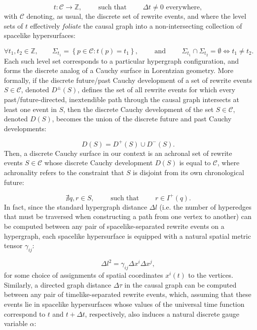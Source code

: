 \documentclass{article}
\begin{document}
\begin{equation}
t : \mathcal{C} \to \mathbb{Z}, \qquad \text{ such that } \qquad \Delta t \neq 0 \text{ everywhere},
\end{equation}
with ${\mathcal{C}}$ denoting, as usual, the discrete set of rewrite events, and where the level sets of $t$ effectively \textit{foliate} the causal graph into a non-intersecting collection of spacelike hypersurfaces:

\begin{equation}
\forall t_1, t_2 \in \mathbb{Z}, \qquad \Sigma_{t_1} = \left\lbrace p \in \mathcal{C} : t \left( p \right) = t_1 \right\rbrace, \qquad \text{ and } \qquad \Sigma_{t_1} \cap \Sigma_{t_2} = \emptyset \Leftrightarrow t_1 \neq t_2.
\end{equation}
Each such level set corresponds to a particular hypergraph configuration, and forms the discrete analog of a Cauchy surface in Lorentzian geometry. More formally, if the discrete future/past Cauchy development of a set of rewrite events ${S \in \mathcal{C}}$, denoted ${D^{\pm} \left( S \right)}$, defines the set of all rewrite events for which every past/future-directed, inextendible path through the causal graph intersects at least one event in $S$, then the discrete Cauchy development of the set ${S \in \mathcal{C}}$, denoted ${D \left( S \right)}$, becomes the union of the discrete future and past Cauchy developments:

\begin{equation}
D \left( S \right) = D^{+} \left( S \right) \cup D^{-} \left( S \right).
\end{equation}
Then, a discrete Cauchy surface in our context is an achronal set of rewrite events ${S \in \mathcal{C}}$ whose discrete Cauchy development ${D \left( S \right)}$ is equal to ${\mathcal{C}}$, where achronality refers to the constraint that $S$ is disjoint from its own chronological future:

\begin{equation}
\nexists q, r \in S, \qquad \text{ such that } \qquad r \in I^{+} \left( q \right).
\end{equation}
In fact, since the standard hypergraph distance ${\Delta l}$ (i.e. the number of hyperedges that must be traversed when constructing a path from one vertex to another) can be computed between any pair of spacelike-separated rewrite events on a hypergraph, each spacelike hypersurface is equipped with a natural spatial metric tensor ${\gamma_{i j}}$:

\begin{equation}
\Delta l^2 = \gamma_{i j} \Delta x^i \Delta x^j,
\end{equation}
for some choice of assignments of spatial coordinates ${x^i \left( t \right)}$ to the vertices. Similarly, a directed graph distance ${\Delta \tau}$ in the causal graph can be computed between any pair of timelike-separated rewrite events, which, assuming that these events lie in spacelike hypersurfaces whose values of the universal time function correspond to $t$ and ${t + \Delta t}$, respectively, also induces a natural discrete gauge variable ${\alpha}$:
\end{document}
